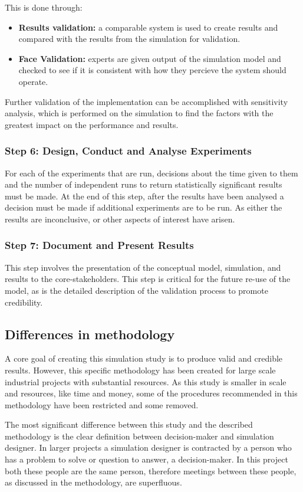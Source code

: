 This is done through:
\begin{itemize}
  \item \textbf{Results validation: } a comparable system is used to create results and compared with the results from the simulation for validation.
  \item \textbf{Face Validation: } experts are given output of the simulation model and checked to see if it is consistent with how they percieve the system should operate.
\end{itemize}

Further validation of the implementation can be accomplished with sensitivity analysis,
which is performed on the simulation to find the factors with the greatest impact on the performance and results.

\subsubsection{Step 6: Design, Conduct and Analyse Experiments}
For each of the experiments that are run, decisions about the time given to them and the number of independent runs to return statistically significant results must be made.
At the end of this step, after the results have been analysed a decision must be made if additional experiments are to be run.
As either the results are inconclusive, or other aspects of interest have arisen.

\subsubsection{Step 7: Document and Present Results}
This step involves the presentation of the conceptual model, simulation, and results to the core-stakeholders.
This step is critical for the future re-use of the model, as is the detailed description of the validation process to promote credibility.

\subsection{Differences in methodology}
A core goal of creating this simulation study is to produce valid and credible results.
However, this specific methodology has been created for large scale industrial projects with substantial resources.
As this study is smaller in scale and resources, like time and money, some of the procedures recommended in this methodology have been restricted and some removed.

The most significant difference between this study and the described methodology is the clear definition between decision-maker and simulation designer.
In larger projects a simulation designer is contracted by a person who has a problem to solve or question to answer, a decision-maker.
In this project both these people are the same person, therefore meetings between these people, as discussed in the methodology, are superfluous.

